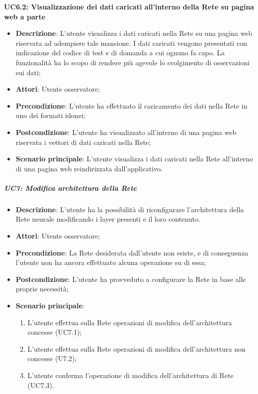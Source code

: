 \textbf{UC6.2: Visualizzazione dei dati caricati all'interno della Rete su pagina web a parte}\mbox{}
\label{UC6.2: Visualizzazione dei dati caricati all'interno della Rete su pagina web a parte}
\noindent
\begin{itemize}
\item \textbf{Descrizione}: L'utente visualizza i dati caricati nella Rete su una pagina web riservata ad adempiere tale mansione. I dati caricati vengono presentati con indicazione del codice di test e di domanda a cui ognuno fa capo. La funzionalit\`a ha lo scopo di rendere pi\`u agevole lo svolgimento di osservazioni sui dati;
\item \textbf{Attori}: Utente osservatore;
\item \textbf{Precondizione}: L'utente ha  effettuato il caricamento dei dati nella Rete in uno dei formati idonei;
\item \textbf{Postcondizione}: L'utente ha visualizzato all'interno di una pagina web riservata i vettori di dati caricati nella Rete;
\item \textbf{Scenario principale}: L'utente visualizza i dati caricati nella Rete all'interno di una pagina web reindirizzata dall'applicativo.
\end{itemize}

\subparagraph{UC7: Modifica architettura della Rete}\mbox{}
\label{UC7: Modifica architettura della Rete}
\noindent
\begin{itemize}
\item \textbf{Descrizione}: L'utente ha la possibilit\`a di riconfigurare l'architettura della Rete neurale modificando i layer presenti e il loro contenuto.
\item \textbf{Attori}: Utente osservatore;
\item \textbf{Precondizione}: La Rete desiderata dall'utente non esiste, e di conseguenza l'utente non ha ancora effettuato alcuna operazione su di essa;
\item \textbf{Postcondizione}: L'utente ha provveduto a configurare la Rete in base alle proprie necessit\`a;
\item \textbf{Scenario principale}:
\begin{enumerate}
\item L'utente effettua sulla Rete operazioni di modifica dell'architettura concesse (UC7.1);
\item L'utente effettua sulla Rete operazioni di modifica dell'architettura non concesse (U7.2);
\item L'utente conferma l'operazione di modifica dell'architettura di Rete (UC7.3).
\end{enumerate}
\end{itemize}

